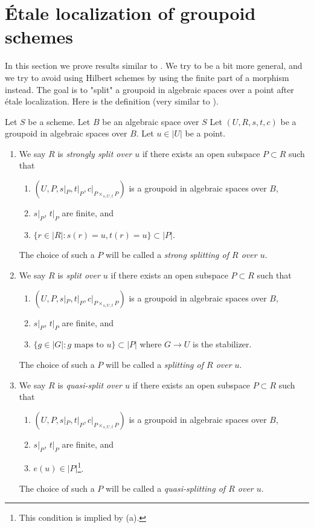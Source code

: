 \section{\'Etale localization of groupoid schemes}
\label{section-etale-localize}

\noindent
In this section we prove results similar to \cite[Proposition 4.2]{K-M}.
We try to be a bit more general, and we try to avoid using Hilbert schemes
by using the finite part of a morphism instead.
The goal is to "split" a groupoid in algebraic spaces over a point
after \'etale localization. Here is the definition (very similar to
\cite[Definition 4.1]{K-M}).

\begin{definition}
\label{definition-split-at-point}
Let $S$ be a scheme. Let $B$ be an algebraic space over $S$
Let $(U, R, s, t, c)$ be a groupoid in algebraic spaces over $B$.
Let $u \in |U|$ be a point.
\begin{enumerate}
\item We say $R$ is {\it strongly split over $u$} if there exists an open
subspace $P \subset R$ such that
\begin{enumerate}
\item $(U, P, s|_P, t|_P, c|_{P \times_{s, U, t} P})$ is a
groupoid in algebraic spaces over $B$,
\item $s|_P$, $t|_P$ are finite, and
\item $\{r \in |R| : s(r) = u, t(r) = u\} \subset |P|$.
\end{enumerate}
The choice of such a $P$ will be called a
{\it strong splitting of $R$ over $u$}.
\item We say $R$ is {\it split over $u$} if there exists an open
subspace $P \subset R$ such that
\begin{enumerate}
\item $(U, P, s|_P, t|_P, c|_{P \times_{s, U, t} P})$ is a
groupoid in algebraic spaces over $B$,
\item $s|_P$, $t|_P$ are finite, and
\item $\{g \in |G| : g\text{ maps to }u\} \subset |P|$ where
$G \to U$ is the stabilizer.
\end{enumerate}
The choice of such a $P$ will be called a
{\it splitting of $R$ over $u$}.
\item We say $R$ is {\it quasi-split over $u$} if there exists an open
subspace $P \subset R$ such that
\begin{enumerate}
\item $(U, P, s|_P, t|_P, c|_{P \times_{s, U, t} P})$ is a
groupoid in algebraic spaces over $B$,
\item $s|_P$, $t|_P$ are finite, and
\item $e(u) \in |P|$\footnote{This condition is implied by (a).}.
\end{enumerate}
The choice of such a $P$ will be called a {\it quasi-splitting of $R$ over $u$}.
\end{enumerate}
\end{definition}

